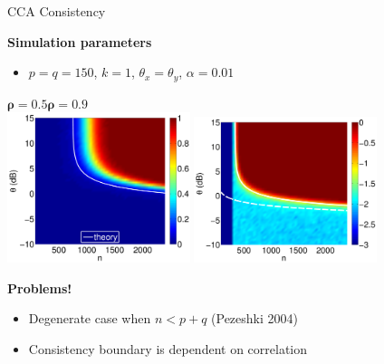 \documentclass[8pt]{beamer}
\begin{document}
\begin{frame}{CCA Consistency}

  \textbf{Simulation parameters}
  \begin{itemize}
  \item $p=q=150$, $k=1$, $\theta_x=\theta_y$, $\alpha=0.01$
  \end{itemize}

  \vspace{1ex}

  \begin{center}  $\boldsymbol{\rho=}\mathbf{0.5}$\hspace{25ex}$\boldsymbol{\rho=0.9}$\\[0.5ex]
  \includegraphics[width=0.4\textwidth]{figures/cca_rho5.pdf}\hspace{2ex}
  \includegraphics[width=0.4\textwidth]{figures/cca_rho9.pdf}
\end{center}



  
  \textbf{Problems!}
  \begin{itemize}
  \item Degenerate case when $n<p+q$ (Pezeshki 2004)
  \item Consistency boundary is dependent on correlation
  \end{itemize}

\end{frame}
\end{document}
